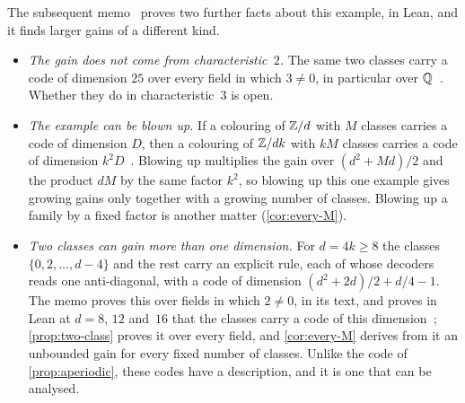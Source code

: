 The subsequent memo~\cite{ClassUniformMemo2026} proves two further facts about this example, in Lean, and it finds
larger gains of a different kind.
\begin{itemize}[leftmargin=1.5em]
\item \emph{The gain does not come from characteristic~$2$.} The same two classes carry a code of dimension $25$ over
every field in which $3\ne0$, in particular over $\mathbb{Q}$~\cite[Theorem~3.2]{ClassUniformMemo2026}. Whether they do in
characteristic~$3$ is open.
\item \emph{The example can be blown up.} If a colouring of $\mathbb{Z}/d$ with $M$ classes carries a code of dimension $D$,
then a colouring of $\mathbb{Z}/dk$ with $kM$ classes carries a code of dimension
$k^2D$~\cite[Theorem~4.2]{ClassUniformMemo2026}. Blowing up multiplies the gain over $(d^2+Md)/2$ and the product $dM$
by the same factor $k^2$, so blowing up this one example gives growing gains only together with a growing number of
classes. Blowing up a family by a fixed factor is another matter (\cref{cor:every-M}).
\item \emph{Two classes can gain more than one dimension.} For $d=4k\ge8$ the classes $\{0,2,\dots,d-4\}$ and the rest
carry an explicit rule, each of whose decoders reads one anti-diagonal, with a code of dimension
$(d^2+2d)/2+d/4-1$. The memo proves this over fields in which $2\ne0$, in its text, and proves in Lean at $d=8$, $12$
and~$16$ that the classes carry a code of this dimension~\cite[Theorems~4.8 and~4.9]{ClassUniformMemo2026};
\cref{prop:two-class} proves it over every field, and \cref{cor:every-M} derives from it an unbounded gain for every
fixed number of classes. Unlike the code of \cref{prop:aperiodic}, these codes have a description, and it is one that
can be analysed.
\end{itemize}
